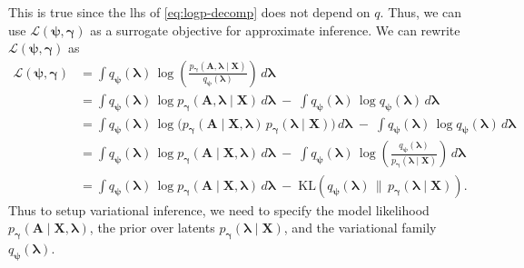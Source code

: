 This is true since the lhs of \eqref{eq:logp-decomp} does not depend on \(q\). 
Thus, we can use \(\mathcal{L}(\boldsymbol{\psi},\boldsymbol{\gamma})\) as a surrogate objective for approximate inference. 
We can rewrite \(\mathcal{L}(\boldsymbol{\psi},\boldsymbol{\gamma})\) as 
\begin{align}
\mathcal{L}(\boldsymbol{\psi},\boldsymbol{\gamma})
&= \int q_{\boldsymbol{\psi}}(\boldsymbol{\lambda})\,\log\!\left(\frac{p_{\boldsymbol{\gamma}}(\mathbf{A},\boldsymbol{\lambda} \mid \mathbf{X})}{q_{\boldsymbol{\psi}}(\boldsymbol{\lambda})}\right)\, d\boldsymbol{\lambda} \\
&= \int q_{\boldsymbol{\psi}}(\boldsymbol{\lambda})\,\log p_{\boldsymbol{\gamma}}(\mathbf{A},\boldsymbol{\lambda} \mid \mathbf{X})\, d\boldsymbol{\lambda}
   \;-\; \int q_{\boldsymbol{\psi}}(\boldsymbol{\lambda})\,\log q_{\boldsymbol{\psi}}(\boldsymbol{\lambda})\, d\boldsymbol{\lambda} \\
&= \int q_{\boldsymbol{\psi}}(\boldsymbol{\lambda})\,\log\!\Big( p_{\boldsymbol{\gamma}}(\mathbf{A}\mid \mathbf{X},\boldsymbol{\lambda})\,p_{\boldsymbol{\gamma}}(\boldsymbol{\lambda}\mid \mathbf{X}) \Big)\, d\boldsymbol{\lambda}
   \;-\; \int q_{\boldsymbol{\psi}}(\boldsymbol{\lambda})\,\log q_{\boldsymbol{\psi}}(\boldsymbol{\lambda})\, d\boldsymbol{\lambda} \\
&= \int q_{\boldsymbol{\psi}}(\boldsymbol{\lambda})\,\log p_{\boldsymbol{\gamma}}(\mathbf{A}\mid \mathbf{X},\boldsymbol{\lambda})\, d\boldsymbol{\lambda}
   \;-\; \int q_{\boldsymbol{\psi}}(\boldsymbol{\lambda})\,\log\!\left(\frac{q_{\boldsymbol{\psi}}(\boldsymbol{\lambda})}{p_{\boldsymbol{\gamma}}(\boldsymbol{\lambda}\mid \mathbf{X})}\right)\, d\boldsymbol{\lambda} \\
&= \int q_{\boldsymbol{\psi}}(\boldsymbol{\lambda})\,\log p_{\boldsymbol{\gamma}}(\mathbf{A}\mid \mathbf{X},\boldsymbol{\lambda})\, d\boldsymbol{\lambda}
    \;-\; \mathrm{KL}\!\left(q_{\boldsymbol{\psi}}(\boldsymbol{\lambda})\,\|\,p_{\boldsymbol{\gamma}}(\boldsymbol{\lambda}\mid \mathbf{X})\right).
    \label{eq:elbo-rewrite}
\end{align}
Thus to setup variational inference, we need to specify the model likelihood \(p_{\boldsymbol{\gamma}}(\mathbf{A}\mid \mathbf{X},\boldsymbol{\lambda})\), 
the prior over latents \(p_{\boldsymbol{\gamma}}(\boldsymbol{\lambda}\mid \mathbf{X})\), 
and the variational family \(q_{\boldsymbol{\psi}}(\boldsymbol{\lambda})\).


